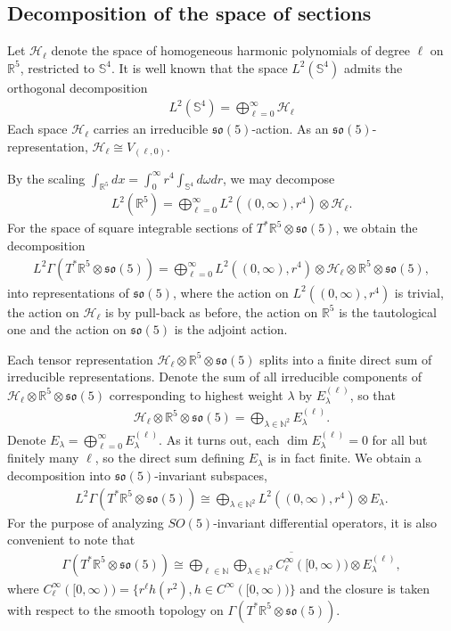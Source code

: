 \documentclass[11pt,reqno]{amsart}
\theoremstyle{remark}
\newcommand{\R}{\mathbb{R}}
\theoremstyle{definition}
\newcommand{\sov}{\mathfrak{so}(5)}
\begin{document}
\subsection{Decomposition of the space of sections}
Let $\mathcal H_\ell$ denote the space of homogeneous harmonic polynomials of degree $\ell$ on $\mathbb R^5$, restricted to $\mathbb S^{4}$. It is well known that the space $L^2(\mathbb S^4)$ admits the orthogonal decomposition 
\begin{align*}
    L^2(\mathbb S^4) = \bigoplus_{\ell=0}^\infty \mathcal H_\ell
\end{align*}
Each space $\mathcal H_\ell$ carries an irreducible $\sov$-action. As an $\sov$-representation, $\mathcal H_\ell \cong V_{(\ell,0)}$.

By the scaling $\int_{\R^5} dx = \int_0^\infty r^4 \int_{\mathbb S^4} d\omega dr$, we may decompose
\begin{align*}
    L^2(\mathbb R^5) = \bigoplus_{\ell=0}^\infty L^2((0,\infty),r^4) \otimes \mathcal H_\ell.
\end{align*}
For the space of square integrable sections of $T^\ast \R^5 \otimes \sov$, we obtain the decomposition
\begin{align*}
    L^2\Gamma(T^\ast \R^5 \otimes \sov) = \bigoplus_{\ell=0}^\infty L^2((0,\infty),r^4) \otimes \mathcal H_\ell \otimes \mathbb R^5 \otimes \sov,
\end{align*}
into representations of $\sov$, where the action on $L^2((0,\infty),r^4)$ is trivial, the action on $\mathcal H_\ell$ is by pull-back as before, the action on $\mathbb R^5$ is the tautological one and the action on $\sov$ is the adjoint action.

Each tensor representation $\mathcal H_\ell \otimes \mathbb R^5 \otimes \sov$ splits into a finite direct sum of irreducible representations. Denote the sum of all irreducible components of $\mathcal H_\ell \otimes \mathbb R^5 \otimes \sov$ corresponding to highest weight $\lambda$ by $E_\lambda^{(\ell)}$, so that
\begin{align*}
    \mathcal H_\ell \otimes \mathbb R^5 \otimes \sov = \bigoplus_{\lambda \in \mathbb N^2} E_\lambda^{(\ell)}.
\end{align*}
Denote $E_\lambda = \bigoplus_{\ell=0}^\infty E_\lambda^{(\ell)}$. As it turns out, each $\dim E_\lambda^{(\ell)} = 0$ for all but finitely many $\ell$, so the direct sum defining $E_\lambda$ is in fact finite. We obtain a decomposition into $\sov$-invariant subspaces,
\begin{align*}
    L^2\Gamma(T^\ast \R^5 \otimes \sov) \cong \bigoplus_{\lambda \in \mathbb N^2} L^2((0,\infty),r^4) \otimes E_{\lambda}.
\end{align*}
For the purpose of analyzing $SO(5)$-invariant differential operators, it is also convenient to note that 
\begin{align*}
    \Gamma(T^\ast \R^5 \otimes \sov) \cong \overline{\bigoplus_{\ell \in \mathbb N} \bigoplus_{\lambda \in \mathbb N^2} C^\infty_\ell([0,\infty)) \otimes E_{\lambda}^{(\ell)}},
\end{align*}
where $C^\infty_\ell([0,\infty)) = \{r^\ell h(r^2), h \in C^\infty([0,\infty))\}$ and the closure is taken with respect to the smooth topology on $\Gamma(T^\ast \R^5 \otimes \sov)$.
\end{document}
